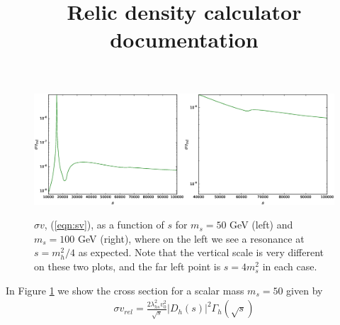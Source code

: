 \documentclass[11pt]{article}
\title{Relic density calculator documentation}
\begin{document}
\maketitle


\begin{figure}
\includegraphics[width=0.5\textwidth]{resonance.eps}\includegraphics[width=0.5\textwidth]{no_resonance.eps}\label{fig:Higgs_res}
\caption{$\sigma v$, (\ref{eqn:sv}), as a function of $s$ for $m_s=50$ GeV (left) and $m_s=100$ GeV (right), where on the left we see a resonance at $s=m_h^2/4$ as expected.  Note that the vertical scale is very different on these two plots, and the far left point is $s=4m_s^2$ in each case.}
\end{figure}

In Figure \ref{fig:Higgs_res} we show the cross section for a scalar mass $m_s=50$ given by
\begin{align}
\sigma v_{rel}=\frac{2\lambda_{hs}^2v_0^2}{\sqrt{s}} |D_h(s)|^2\Gamma_h(\sqrt{s}) \label{eqn:sv}
\end{align}
\end{document}
